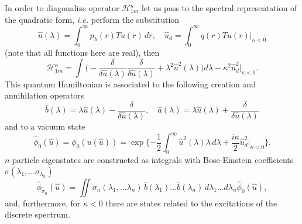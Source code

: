 \documentclass[12pt]{article}
\newcommand{\HH}{\mathscr{H}}
\begin{document}
	In order to diagonalize operator
$ \HH_{1m}^{\kappa} $
	let us pass to the spectral representation of the quadratic form,
	{\it i.e.} perform the substitution
\begin{equation*}
    \hat{u}(\lambda) = \int_{0}^{\infty} p_{\lambda}(r) T u(r)\,dr, \quad
	\hat{u}_{d} =  \int_{0}^{\infty} q(r) T u(r) \bigr|_{\kappa<0}
\end{equation*}
	(note that all functions here are real), then
\begin{equation*}
    \HH_{1m}^{\kappa} = \int \bigl(
-\frac{\delta}{\delta \hat{u}(\lambda)} \frac{\delta}{\delta \hat{u}(\lambda)}
	+ \lambda^{2} \hat{u}^{2}(\lambda) \bigr)d\lambda
	- \kappa^{2} \hat{u}_{d}^{2} \bigr|_{\kappa <0} .
\end{equation*}
	This quantum Hamiltonian is associated to the following
	creation and annihilation operators
\begin{equation*}
    \hat{b}(\lambda) = \lambda \hat{u}(\lambda)
	- \frac{\delta}{\delta \hat{u}(\lambda)} ,\quad
    \hat{a}(\lambda) = \lambda \hat{u}(\lambda) 
	+ \frac{\delta}{\delta \hat{u}(\lambda)}
\end{equation*}
	and to a vacuum state
\begin{equation*}
    \hat{\phi}_{0}(\hat{u}) = \phi_{0}(u(\hat{u})) = \exp\{-\frac{1}{2}
	\int_{0}^{\infty} \hat{u}^{2}(\lambda) \lambda \,d\lambda
	+\frac{i\kappa}{2} \hat{u}_{d}^{2} \bigr|_{\kappa < 0}\} .
\end{equation*}
$ n $-particle eigenstates are constructed as integrals with Bose-Einstein
	coefficients
$ \sigma(\lambda_{1},\ldots \sigma_{\lambda_{n}}) $
\begin{equation}
\label{hatphi}
    \hat{\phi}_{\sigma_{n}}(\hat{u}) = \iint
    \sigma_{n} (\lambda_{1},\ldots \lambda_{n}) \,
	\hat{b}(\lambda_{1}) \ldots \hat{b}(\lambda_{n}) \,
    d\lambda_{1} \ldots d\lambda_{n} \hat{\phi}_{0}(\hat{u}) ,
\end{equation}
	and, furthermore, for
$ \kappa < 0 $
	there are states related to the excitations of the discrete spectrum.
\end{document}
